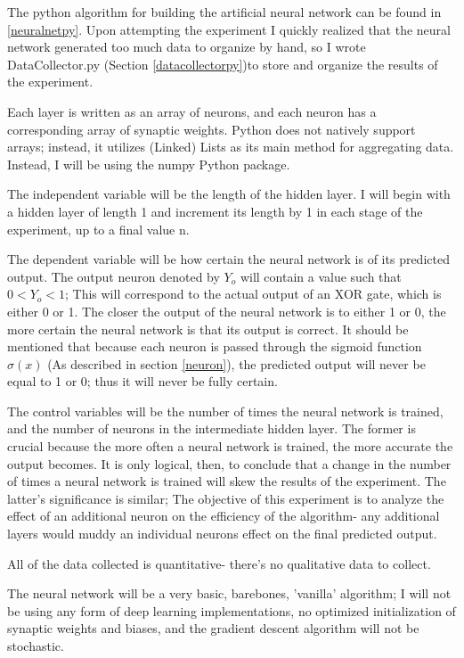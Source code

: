 \documentclass[12pt]{article}
\begin{document}
The python algorithm for building the artificial neural network can be found in \ref{neuralnetpy}. Upon attempting the experiment I quickly realized that the neural network generated too much data to organize by hand, so I wrote DataCollector.py (Section \ref{datacollectorpy})to store and organize the results of the experiment.

Each layer is written as an array of neurons, and each neuron has a corresponding array of synaptic weights. Python does not natively support arrays; instead, it utilizes (Linked) Lists as its main method for aggregating data. Instead, I will be using the numpy Python package.

The independent variable will be the length of the hidden layer. I will begin with a hidden layer of length 1 and increment its length by 1 in each stage of the experiment, up to a final value n.

The dependent variable will be how certain the neural network is of its predicted output. The output neuron denoted by \({Y_o}\) will contain a value such that \(0 < Y_o < 1\); This will correspond to the actual output of an XOR gate, which is either 0 or 1. The closer the output of the neural network is to either 1 or 0, the more certain the neural network is that its output is correct. It should be mentioned that because each neuron is passed through the sigmoid function \(\sigma(x)\) (As described in section \ref{neuron}), the predicted output will never be equal to 1 or 0; thus it will never be fully certain.

The control variables will be the number of times the neural network is trained, and the number of neurons in the intermediate hidden layer. The former is crucial because the more often a neural network is trained, the more accurate the output becomes. It is only logical, then, to conclude that a change in the number of times a neural network is trained will skew the results of the experiment. The latter's significance is similar; The objective of this experiment is to analyze the effect of an additional neuron on the efficiency of the algorithm- any additional layers would muddy an individual neurons effect on the final predicted output.

All of the data collected is quantitative- there's no qualitative data to collect.


The neural network will be a very basic, barebones, 'vanilla' algorithm; I will not be using any form of deep learning implementations, no optimized initialization of synaptic weights and biases, and the gradient descent algorithm will not be stochastic.
\end{document}
